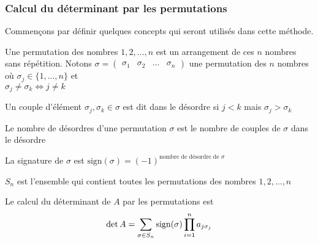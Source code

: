 \subsubsection{Calcul du déterminant par les permutations}
Commençons par définir quelques concepts qui seront utilisés dans cette méthode.
\begin{definition}
    Une permutation des nombres $1, 2, \dots, n$ est un arrangement de ces $n$ nombres sans répétition. Notons $\sigma = \begin{pmatrix}
        \sigma_1 & \sigma_2 & \dots & \sigma_n 
    \end{pmatrix}$ une permutation des $n$ nombres o\`u $\sigma_j \in \{1, \dots, n \}$ et \\ $\sigma_j \neq \sigma_k \iff j \neq k$
\end{definition}
\begin{definition}
    Un couple d'élément $\sigma_j, \sigma_k \in \sigma$ est dit dans le désordre si $j < k$ mais $\sigma_j > \sigma_k$
\end{definition}
\begin{definition}
    Le nombre de désordres d'une permutation $\sigma$ est le nombre de couples de $\sigma$ dans le désordre
\end{definition}
\begin{definition}
    La signature de $\sigma$ est $\text{sign}(\sigma) = (-1)^{\text{nombre de désordre de $\sigma$}}$ 
\end{definition}
\begin{definition}
    $S_n$ est l'ensemble qui contient toutes les permutations des nombres $1, 2, \dots, n$
\end{definition}

\begin{theorem}
    Le calcul du déterminant de $A$ par les permutations est 
    \[
        \det A = \sum_{\sigma \in S_n} \textup{sign}(\sigma) \prod_{i = 1}^{n}a_{j \sigma_j}
    \]
\end{theorem}

